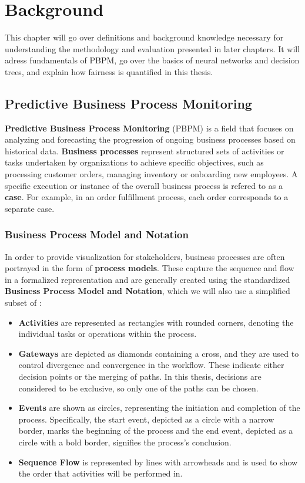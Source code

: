 \chapter{Background}
This chapter will go over definitions and background knowledge
necessary for understanding the methodology and evaluation presented in later chapters.
It will adress fundamentals of PBPM, go over the basics of neural networks and decision trees,
and explain how fairness is quantified in this thesis.

\section{Predictive Business Process Monitoring}
\textbf{Predictive Business Process Monitoring} (PBPM) is a field that focuses on analyzing
and forecasting the progression of ongoing business processes based on historical data. 
\textbf{Business processes} represent structured sets of activities
or tasks undertaken by organizations to achieve specific objectives,
such as processing customer orders, managing inventory or onboarding new employees.
A specific execution or instance of the overall business process is refered to as a \textbf{case}.
For example, in an order fulfillment process, each order corresponds to a separate case.

\subsection{Business Process Model and Notation}
In order to provide visualization for stakeholders,
business processes are often portrayed in the form of \textbf{process models}.
These capture the sequence and flow in a formalized representation
and are generally created using the standardized
\textbf{Business Process Model and Notation},
which we will also use a simplified subset of \cite{bpmn}:
\begin{itemize}
\item \textbf{Activities} are represented as rectangles with rounded corners,
denoting the individual tasks or operations within the process.
\item \textbf{Gateways} are depicted as diamonds containing a cross,
and they are used to control divergence and convergence in the workflow.
These indicate either decision points or the merging of paths.
In this thesis, decisions are considered to be exclusive,
so only one of the paths can be chosen.
\item \textbf{Events} are shown as circles,
representing the initiation and completion of the process.
Specifically, the start event,
depicted as a circle with a narrow border, marks the beginning of the process
and the end event, depicted as a circle with a bold border, signifies the process's conclusion.
\item \textbf{Sequence Flow} is represented by lines with arrowheads
and is used to show the order that activities will be performed in.
\end{itemize}

